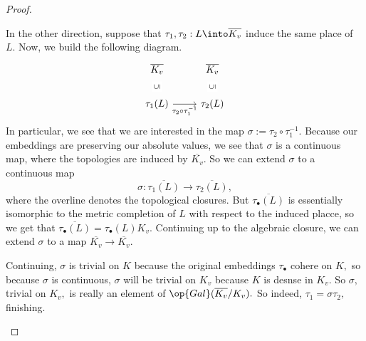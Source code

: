 \begin{proof}
\begin{listalph}
		In the other direction, suppose that $\tau_1,\tau_2:L\into\overline{K_v}$ induce the same place of $L.$ Now, we build the following diagram.
		\[\begin{tikzcd}
			{\overline{K_v}} & {\overline{K_v}} \\
			{\tau_1(L)} & {\tau_2(L)}
			\arrow["{\rotatebox{90}{$\subseteq$}}"{description}, draw=none, from=2-1, to=1-1]
			\arrow["{\rotatebox{90}{$\subseteq$}}"{description}, draw=none, from=2-2, to=1-2]
			\arrow["{\tau_2\circ\tau_1^{-1}}"', from=2-1, to=2-2]
		\end{tikzcd}\]
		In particular, we see that we are interested in the map $\sigma:=\tau_2\circ\tau_1^{-1}.$ Because our embeddings are preserving our absolute values, we see that $\sigma$ is a continuous map, where the topologies are induced by $\overline{K_v}.$ So we can extend $\sigma$ to a continuous map
		\[\sigma:\overline{\tau_1(L)}\to\overline{\tau_2(L)},\]
		where the overline denotes the topological closures. But $\overline{\tau_\bullet(L)}$ is essentially isomorphic to the metric completion of $L$ with respect to the induced placce, so we get that $\overline{\tau_\bullet(L)}=\tau_\bullet(L)K_v.$ Continuing up to the algebraic closure, we can extend $\sigma$ to a map $\overline{K_v}\to\overline{K_v}.$

		Continuing, $\sigma$ is trivial on $K$ because the original embeddings $\tau_\bullet$ cohere on $K,$ so because $\sigma$ is continuous, $\sigma$ will be trivial on $K_v$ because $K$ is desnse in $K_v.$ So $\sigma,$ trivial on $K_v,$ is really an element of $\op{Gal}(\overline{K_v}/K_v).$ So indeed, $\tau_1=\sigma\tau_2,$ finishing.
		\qedhere
	\end{listalph}
\end{proof}

